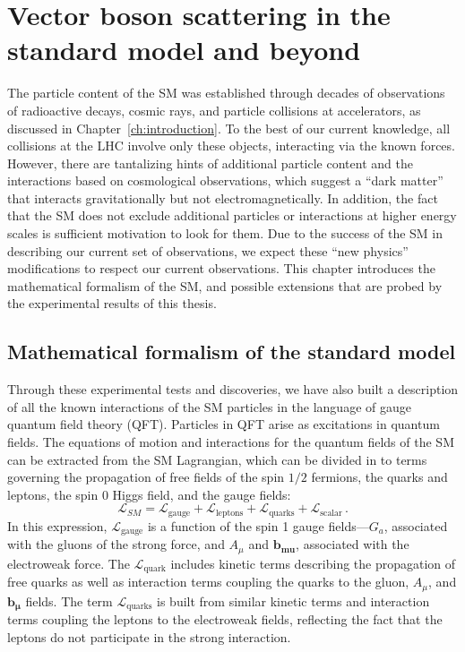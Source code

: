 \chapter{Vector boson scattering in the standard model and beyond}
\label{ch:phenomenology}
The particle content of the SM was established through decades of
observations of radioactive decays, cosmic rays, and particle
collisions at accelerators, as discussed in Chapter~\ref{ch:introduction}. 
To the best of our
current knowledge, all collisions at the LHC involve only these objects,
interacting via the known forces.
However, there are tantalizing hints of additional particle content and the 
interactions based on cosmological observations, which suggest a ``dark matter''
that interacts gravitationally but not electromagnetically. In addition, 
the fact that the SM does not exclude additional particles or interactions at
higher energy scales is sufficient motivation to look for them. Due to the success
of the SM in describing our current set of observations, we expect these
``new physics'' modifications to respect our current observations.
This chapter introduces the mathematical formalism of the SM, and possible
extensions that are probed by the experimental results of this thesis.

\section{Mathematical formalism of the standard model}

Through these experimental tests and
discoveries, we have also built a description of all the known interactions 
of the SM particles in the language of gauge quantum field theory (QFT).
Particles in QFT arise as excitations in quantum fields.
The equations of motion and interactions for the quantum fields of the SM can
be extracted from the SM Lagrangian, which can be divided in to 
terms governing the propagation of free fields of the spin $1/2$ fermions,
the quarks and leptons, the spin 0 Higgs field, and the gauge fields:
\begin{equation}
  \mathcal{L}_{SM} = \mathcal{L}_{\text{gauge}} + \mathcal{L}_{\text{leptons}} + 
      \mathcal{L}_{\text{quarks}} + \mathcal{L}_{\text{scalar}} \,.
  \label{eq:smlagrangian}
\end{equation}
In this expression, $\mathcal{L}_{\text{gauge}}$ is a function of the 
spin 1 gauge fields---$G_a$, associated with the gluons of the strong
force, and $A_\mu$ and $\mathbf{b_{mu}}$, associated with the electroweak force.
The $\mathcal{L}_{\text{quark}}$ includes kinetic terms describing the 
propagation of free quarks as well as interaction terms coupling the quarks
to the gluon, $A_\mu$, and $\mathbf{b_\mu}$ fields. 
The term $\mathcal{L}_{\text{quarks}}$ is built from similar kinetic terms and 
interaction terms coupling the leptons to the electroweak fields, reflecting
the fact that the leptons do not participate in the strong interaction.

